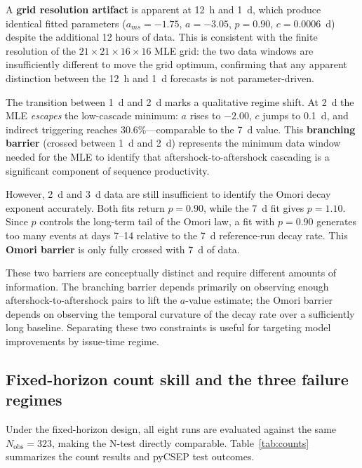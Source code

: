 \documentclass[12pt,letterpaper]{article}
\begin{document}
A \textbf{grid resolution artifact} is apparent at 12~h and 1~d, which produce
identical fitted parameters ($a_{ms}=-1.75$, $a=-3.05$, $p=0.90$,
$c=0.0006$~d) despite the additional 12 hours of data. This is consistent
with the finite resolution of the $21\times21\times16\times16$ MLE grid:
the two data windows are insufficiently different to move the grid optimum,
confirming that any apparent distinction between the 12~h and 1~d forecasts
is not parameter-driven.

The transition between 1~d and 2~d marks a qualitative regime shift. At 2~d the
MLE \emph{escapes} the low-cascade minimum: $a$ rises to $-2.00$, $c$ jumps to
0.1~d, and indirect triggering reaches 30.6\%---comparable to the 7~d value.
This \textbf{branching barrier} (crossed between 1~d and 2~d) represents the
minimum data window needed for the MLE to identify that aftershock-to-aftershock
cascading is a significant component of sequence productivity.

However, 2~d and 3~d data are still insufficient to identify the Omori decay
exponent accurately. Both fits return $p=0.90$, while the 7~d fit gives
$p=1.10$. Since $p$ controls the long-term tail of the Omori law, a fit with
$p=0.90$ generates too many events at days 7--14 relative to the 7~d
reference-run decay rate. This \textbf{Omori barrier} is only fully crossed
with 7~d of data.

These two barriers are conceptually distinct and require different amounts of
information. The branching barrier depends primarily on observing enough
aftershock-to-aftershock pairs to lift the $a$-value estimate; the Omori
barrier depends on observing the temporal curvature of the decay rate over a
sufficiently long baseline. Separating these two constraints is useful for
targeting model improvements by issue-time regime.

\subsection{Fixed-horizon count skill and the three failure regimes}
\label{sec:count}

Under the fixed-horizon design, all eight runs are evaluated against the same
$N_{\mathrm{obs}}=323$, making the N-test directly comparable.
Table~\ref{tab:counts} summarizes the count results and pyCSEP test outcomes.
\end{document}
